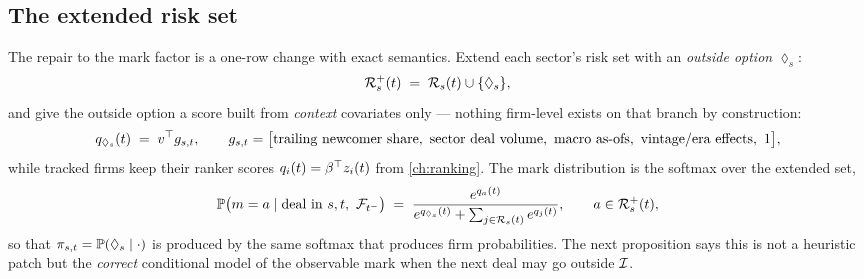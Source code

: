 \subsection{The extended risk set}\label{ch11:sec:extended}

The repair to the mark factor is a one-row change with exact semantics.
Extend each sector's risk set with an \emph{outside option} $\lozenge_s$:
\begin{equation}\label{eq:ch11:extendedset}
\mathcal{R}^{+}_s(t) \;=\; \mathcal{R}_s(t) \cup \{\lozenge_s\},
\end{equation}
and give the outside option a score built from \emph{context} covariates
only --- nothing firm-level exists on that branch by construction:
\begin{equation}\label{eq:ch11:outsidescore}
q_{\lozenge_s}(t) \;=\; v^{\top} g_{s,t},
\qquad
g_{s,t} = \big[\text{trailing newcomer share},\ \text{sector deal volume},\
\text{macro as-ofs},\ \text{vintage/era effects},\ 1\big],
\end{equation}
while tracked firms keep their ranker scores $q_i(t) =
\beta^{\top}z_i(t)$ from \cref{ch:ranking}. The mark distribution is the
softmax over the extended set,
\begin{equation}\label{eq:ch11:extendedsoftmax}
\mathbb{P}\big(m = a \mid \text{deal in } s,t,\ \mathcal{F}_{t^-}\big)
 \;=\;
 \frac{e^{q_a(t)}}
      {e^{q_{\lozenge_s}(t)} + \sum_{j \in \mathcal{R}_s(t)} e^{q_j(t)}},
\qquad a \in \mathcal{R}^{+}_s(t),
\end{equation}
so that $\pi_{s,t} = \mathbb{P}(\lozenge_s \mid \cdot)$ is produced by the same
softmax that produces firm probabilities. The next proposition says this
is not a heuristic patch but the \emph{correct} conditional model of the
observable mark when the next deal may go outside $\mathcal{I}$.

